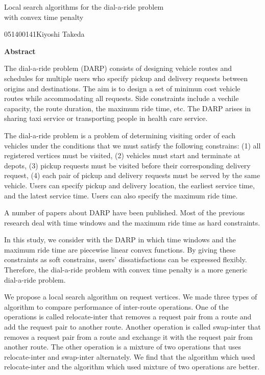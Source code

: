 

\newpage
\begin{center}{\LARGE Local  search algorithms for the dial-a-ride problem\\ with convex time penalty}\\[0.5cm]
\end{center}
\hfill {\large 051400141\qquad Kiyoshi Takeda}\\[0.5cm]
\begin{center}
{\large \bf Abstract}\\
\end{center}
The dial-a-ride problem (DARP) consists of designing vehicle routes and schedules for multiple users who specify pickup and delivery requests between origins and destinations. The aim is to design a set of minimun cost vehicle routes while accommodating all requests. Side constraints include a vechile capacity, the route duration, the maximum ride time, etc. The DARP arises in sharing taxi service or transporting people in health care service.

The dial-a-ride problem is a problem of determining visiting order of each vehicles under the conditions that we must satisfy the following constrains: (1) all registered vertices must be visited, (2) vehicles must start and terminate at depots, (3) pickup requests must be visited before their corresponding delivery request, (4) each pair of pickup and delivery requests must be served by the same vehicle.  Users can specify pickup and delivery location, the earliest service time, and the latest service time. Users can also specify the maximum ride time.

A number of papers about DARP have been published. Most of the previous research deal with time windows and the maximum ride time as hard constraints.

In this study, we consider with the DARP in which time windows and the maximum ride time are piecewise linear convex functions. By giving these constraints as soft constrains, users' dissatisfactions can be expressed flexibly. Therefore, the dial-a-ride problem with convex time penalty is a more generic dial-a-ride problem.

We propose a local search algorithm on request vertices. We made three types of algorithm to compare performance of inter-route operations.
One of the operations is called relocate-inter that removes a request pair from a route and add the request pair to another route. Another operation is called swap-inter that removes a request pair from a route and exchange it with the request pair from another route. The other operation is a mixture of two operations that uses relocate-inter and swap-inter alternately.
We find that the algorithm which used relocate-inter and the algorithm which used mixture of two operations are better.

